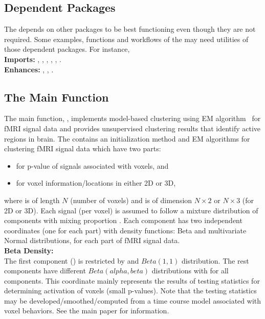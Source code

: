 \subsection[Dependent Packages]{Dependent Packages}

The  depends on other  packages to be best functioning
even though they are not required.
Some examples, functions and workflows of the
 may need utilities of those dependent packages.
For instance,
\\
\hspace*{0.5cm}
{\bf Imports:} , , ,
, , .
\\
\hspace*{0.5cm}
{\bf Enhances:} , , .


\subsection[The Main Function]{The Main Function}

The main function, , implements model-based clustering
using EM algorithm~\citep{McLachlan1996} for fMRI signal data and provides
unsupervised clustering results that identify active regions in brain.
The  contains an initialization method and
EM algorithms for clustering fMRI signal data which have two parts:
\begin{itemize}
\item
{} for p-value of signals associated with voxels, and
\item
{} for voxel information/locations in either 2D or 3D,
\end{itemize}
where  is of length $N$ (number of voxels) and
 is of dimension $N \times 2$ or $N \times 3$ (for 2D or 3D).
Each signal (per voxel) is assumed to follow a mixture distribution
of  components with mixing proportion .
Each component has
two independent coordinates (one for each part)
with density functions: Beta and multivariate
Normal distributions, for each part of fMRI signal data.
\\

{\bf Beta Density:}\\
The first component ()
is restricted by  and $Beta(1, 1)$
distribution. The rest  components have different
$Beta(alpha, beta)$ distributions with  for all
 components.
This coordinate mainly represents the results of testing statistics
for determining activation of voxels (small p-values).
Note that the testing statistics may be developed/smoothed/computed
from a time course model associated with voxel behaviors.
See the main paper \citet{ChenMaitra2018} for information.
\\

